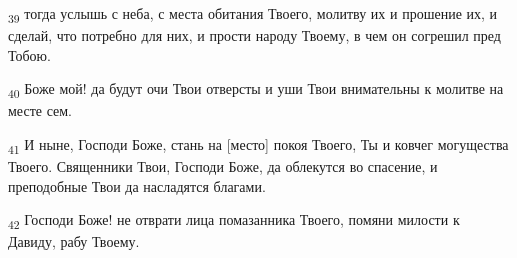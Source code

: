 \begin{tcolorbox}
\textsubscript{39} тогда услышь с неба, с места обитания Твоего, молитву их и прошение их, и сделай, что потребно для них, и прости народу Твоему, в чем он согрешил пред Тобою.
\end{tcolorbox}
\begin{tcolorbox}
\textsubscript{40} Боже мой! да будут очи Твои отверсты и уши Твои внимательны к молитве на месте сем.
\end{tcolorbox}
\begin{tcolorbox}
\textsubscript{41} И ныне, Господи Боже, стань на [место] покоя Твоего, Ты и ковчег могущества Твоего. Священники Твои, Господи Боже, да облекутся во спасение, и преподобные Твои да насладятся благами.
\end{tcolorbox}
\begin{tcolorbox}
\textsubscript{42} Господи Боже! не отврати лица помазанника Твоего, помяни милости к Давиду, рабу Твоему.
\end{tcolorbox}
